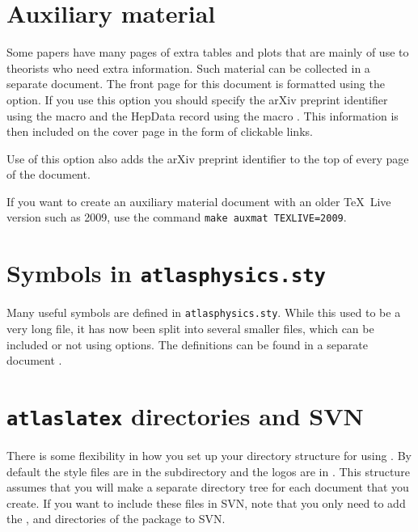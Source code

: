 \section{Auxiliary material}
\label{sec:auxmat}

Some papers have many pages of extra tables and plots that are mainly of use to theorists
who need extra information.
Such material can be collected in a separate document.
The front page for this document is formatted using the  option.
If you use this option you should specify the arXiv preprint identifier
using the macro  and the HepData record using the macro
.
This information is then included on the cover page in the form of clickable links.

Use of this option also adds the arXiv preprint identifier to the top of every page
of the document.

If you want to create an auxiliary material document with an older \TeX\ Live version such as 2009, 
use the command \texttt{make auxmat TEXLIVE=2009}.


\section{Symbols in \texttt{atlasphysics.sty}}
\label{sec:atlasphysics}

Many useful symbols are defined in \texttt{atlasphysics.sty}.
While this used to be a very long file, it has now been split into several smaller files,
which can be included or not using options.
The definitions can be found in a separate document .


\section{\texttt{atlaslatex} directories and SVN}
\label{sec:svn}

There is some flexibility in how you set up your directory structure for using .
By default the  style files are in the  subdirectory and the
logos are in . This structure assumes that you will make a separate directory tree
for each document that you create. If you want to include these files in SVN, note that you only need to add the
,  and  directories of the  package to SVN.

